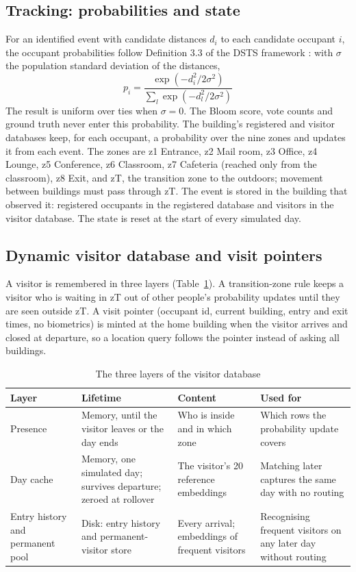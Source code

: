 \documentclass[12pt,a4paper,oneside]{report}
\begin{document}
\subsection{Tracking: probabilities and state}
For an identified event with candidate distances $d_i$ to each candidate occupant $i$, the occupant probabilities follow Definition 3.3 of the DSTS framework \cite{ref6}: with $\sigma$ the population standard deviation of the distances,
\begin{equation}\label{eq:prob}
p_i=\frac{\exp\!\left(-d_i^{2}/2\sigma^{2}\right)}{\sum_{l}\exp\!\left(-d_l^{2}/2\sigma^{2}\right)}
\end{equation}
The result is uniform over ties when $\sigma=0$. The Bloom score, vote counts and ground truth never enter this probability. The building's registered and visitor databases keep, for each occupant, a probability over the nine zones and updates it from each event. The zones are z1 Entrance, z2 Mail room, z3 Office, z4 Lounge, z5 Conference, z6 Classroom, z7 Cafeteria (reached only from the classroom), z8 Exit, and zT, the transition zone to the outdoors; movement between buildings must pass through zT. The event is stored in the building that observed it: registered occupants in the registered database and visitors in the visitor database. The state is reset at the start of every simulated day.

\subsection{Dynamic visitor database and visit pointers}
A visitor is remembered in three layers (Table~\ref{tab:visitor}). A transition-zone rule keeps a visitor who is waiting in zT out of other people's probability updates until they are seen outside zT. A visit pointer (occupant id, current building, entry and exit times, no biometrics) is minted at the home building when the visitor arrives and closed at departure, so a location query follows the pointer instead of asking all buildings.

\begin{table}[htbp]
\centering
\caption{The three layers of the visitor database}\label{tab:visitor}
{\small\setlength{\tabcolsep}{4pt}\renewcommand{\arraystretch}{1.2}
\begin{tabular}{|p{2.68cm}|p{3.83cm}|p{3.64cm}|p{3.83cm}|}\hline
\textbf{Layer} & \textbf{Lifetime} & \textbf{Content} & \textbf{Used for}\\\hline
Presence & Memory, until the visitor leaves or the day ends & Who is inside and in which zone & Which rows the probability update covers\\\hline
Day cache & Memory, one simulated day; survives departure; zeroed at rollover & The visitor's 20 reference embeddings & Matching later captures the same day with no routing\\\hline
Entry history and permanent pool & Disk: entry history and permanent-visitor store & Every arrival; embeddings of frequent visitors & Recognising frequent visitors on any later day without routing\\\hline
\end{tabular}}
\end{table}
\end{document}
